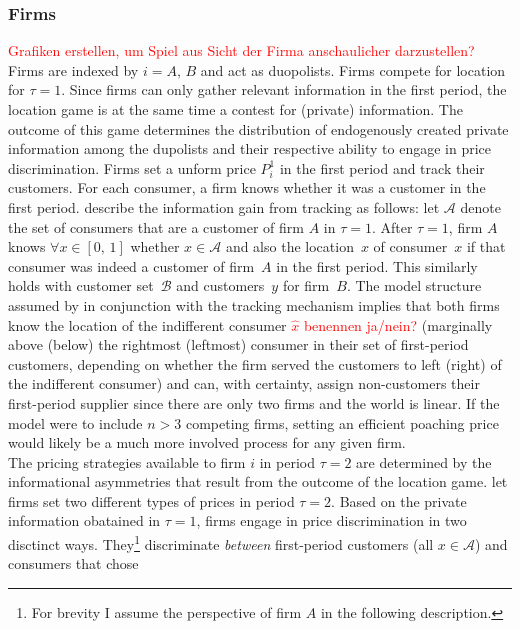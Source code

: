 \documentclass[a4paper, 11 pt, fleqn]{article}
\begin{document}
\subsubsection{Firms}
\textcolor{red}{Grafiken erstellen, um Spiel aus Sicht der Firma anschaulicher darzustellen?}
Firms are indexed by $i = A,\,B$ and act as duopolists. Firms compete for location for $\tau=1$. Since firms can only gather relevant
information in the first period, the location game is at the same time a contest for (private) information. The outcome of this game
determines the distribution of endogenously created private information among the dupolists and their respective ability to engage in
price discrimination. Firms set a unform price $P^1_i$ in the first period and track their customers. For each consumer, a firm knows
whether it was a customer in the first period. \citet[p. 5672]{Choe.2018} describe the information gain from tracking as follows:
let $\mathscr{A}$ denote the set of consumers that are a customer of firm $A$ in $\tau=1$. After $\tau=1$, firm $A$ knows
$\forall x \in [0,\,1]$ whether $x\in \mathscr{A}$ and also the location~$x$ of consumer~$x$ if that consumer was indeed a customer
of firm~$A$ in the first period. This similarly holds with customer set~$\mathscr{B}$ and customers~$y$ for firm~$B$.
The model structure assumed by \citet{Choe.2018} in conjunction with the tracking mechanism
implies that both firms know the location of the indifferent consumer \textcolor{red}{$\hat{x}$ benennen ja/nein?} (marginally above (below) the rightmost (leftmost) consumer in their
set of first-period customers, depending on whether the firm served the customers to left (right) of the indifferent consumer) and can, with
certainty, assign non-customers their first-period supplier since there are only two firms and the world is linear. If the model were to include
$n > 3$ competing firms, setting an efficient poaching price would likely be a much more involved process for any given firm. \\
The pricing strategies available to firm $i$ in period $\tau=2$ are determined by the informational asymmetries that result from the outcome
of the location game. \citet[p. 5672]{Choe.2018} let firms set two different types of prices in period $\tau=2$. Based on the private
information obatained in $\tau=1$, firms engage in price discrimination in two disctinct ways. They\footnote{For brevity I assume the perspective
of firm $A$ in the following description.} discriminate \textit{between} first-period customers (all $x\in\mathscr{A}$) and consumers that chose
\end{document}
